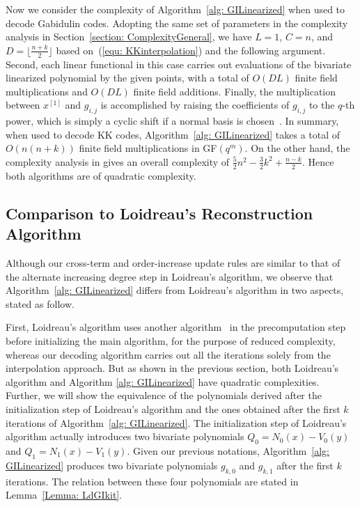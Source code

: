 \documentclass[11pt,onecolumn,draftcls]{IEEEtran}
\begin{document}
Now we consider the complexity of Algorithm~\ref{alg: GILinearized} when used to decode Gabidulin codes. Adopting the same set of parameters in the complexity analysis in Section~\ref{section: ComplexityGeneral}, we have $L = 1$, $C = n$, and $D = \lfloor \frac{n+k}{2} \rfloor$ based on~(\ref{equ: KKinterpolation}) and the following argument. Second, each linear functional in this case carries out evaluations of the bivariate linearized polynomial by the given points, with a total of $O(DL)$ finite field multiplications and  $O(DL)$ finite field additions.
Finally, the multiplication between $x^{[1]}$ and $g_{i,j}$ is accomplished by raising the coefficients of $g_{i,j}$ to the $q$-th power, which is simply a cyclic shift if a normal basis is chosen~\cite{silva_isit09}\cite{max_ciss08}.
In summary, when used to decode KK codes, Algorithm~\ref{alg: GILinearized} takes a total of $O(n(n+k))$ finite field multiplications in GF$(q^m)$.  On the other hand, the complexity analysis in \cite{Loidreau_wcc06} gives an overall complexity of $\frac{5}{2}n^2 - \frac{3}{2}k^2 + \frac{n-k}{2}$. Hence both algorithms are of quadratic complexity.

\subsection{Comparison to Loidreau's Reconstruction Algorithm}

Although our cross-term and order-increase update rules are similar to that of the alternate increasing degree step in Loidreau's algorithm, we observe that Algorithm~\ref{alg: GILinearized} differs from Loidreau's algorithm in two aspects, stated as follow.

First, Loidreau's algorithm uses another algorithm~\cite{ore_ams34} in the precomputation step before initializing the main algorithm, for the purpose of reduced complexity, whereas our decoding algorithm carries out all the iterations solely from the interpolation approach. But as shown in the previous section, both Loidreau's algorithm and Algorithm \ref{alg: GILinearized} have quadratic complexities. Further, we will show the equivalence of the polynomials derived after the initialization step of Loidreau's algorithm and the ones obtained after the first $k$ iterations of Algorithm~\ref{alg: GILinearized}. The initialization step of Loidreau's algorithm actually introduces two bivariate polynomials $Q_0 = N_0(x) - V_0(y)$ and $Q_1 = N_1(x) - V_1(y)$. Given our previous notations, Algorithm~\ref{alg: GILinearized} produces two bivariate polynomials $g_{k, 0}$ and $g_{k,1}$ after the first $k$ iterations. The relation between these four polynomials are stated in Lemma~\ref{Lemma: LdGIkit}.
\end{document}
